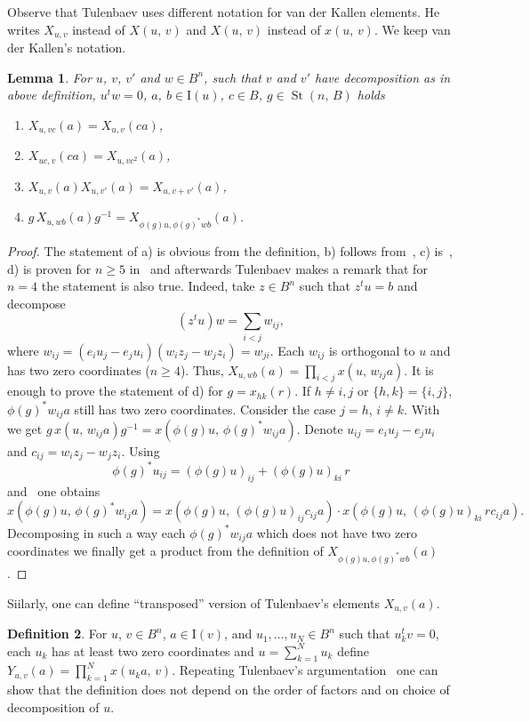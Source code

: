 \documentclass[11pt]{amsart}
\theoremstyle{plain} \declaretheorem[name=Theorem, Refname={Theorem,Theorems}]{tm} \Crefname{tm}{Theorem}{Theorems}
\numberwithin{equation}{section}
\newtheorem{lm}{Lemma} \numberwithin{lm}{section} \Crefname{lm}{Lemma}{Lemmas}
\theoremstyle{definition} \newtheorem{df}[lm]{Definition} \Crefname{df}{Definition}{Definitions}
\theoremstyle{remark} \newtheorem{rk}[lm]{Remark} \Crefname{rk}{Remark}{Remarks}
\newcommand{\St}{\mathop{\mathrm{St}}\nolimits}
\newcommand{\inv}{^{-1}}
\begin{document}
Observe that Tulenbaev uses different notation for van der Kallen elements. He writes $X_{u,v}$ instead of $X(u,\,v)$ and $X(u,\,v)$ instead of $x(u,\,v)$. We keep van der Kallen's notation.

\begin{lm}
\label{xproperties}
For $u$, $v$, $v'$ and $w\in B^n$, such that $v$ and $v'$ have decomposition as in above definition, $u^tw=0$, $a$, $b\in\mathrm I(u)$, $c\in B$, $g\in\St(n,\,B)$ holds
\begin{enumerate}
\item
$X_{u,vc}(a)=X_{u,v}(ca)$,
\item
$X_{uc,v}(ca)=X_{u,vc^2}(a)$,
\item
$X_{u,v}(a)X_{u,v'}(a)=X_{u,v+v'}(a)$,
\item
$g\,X_{u,wb}(a)g\inv=X_{\phi(g)u,\phi(g)^*wb}(a)$.
\end{enumerate}
\end{lm}

\begin{proof}
The statement of a) is obvious from the definition, b) follows from~\cite[Lem.~1.1\,d)]{Tul}, c) is~\cite[Lem.~1.3\,a)]{Tul}, d) is proven for $n\geq5$ in~\cite[Lem.~1.3\,b)]{Tul} and afterwards Tulenbaev makes a remark that for $n=4$ the statement is also true. Indeed, take $z\in B^n$ such that $z^tu=b$ and decompose
$$
(z^tu)w=\sum_{i<j}w_{ij},
$$
where $w_{ij}=(e_iu_j-e_ju_i)(w_iz_j-w_jz_i)=w_{ji}$. Each $w_{ij}$ is orthogonal to $u$ and has two zero coordinates ($n\geq4$). Thus, $X_{u,wb}(a)=\prod_{i<j}x(u,\,w_{ij}a)$. It is enough to prove the statement of d) for $g=x_{hk}(r)$. If $h\neq i,j$ or $\{h,k\}=\{i,j\}$, $\phi(g)^*w_{ij}a$ still has two zero coordinates. Consider the case $j=h$, $i\neq k$. With~\cite[3.12]{vdK} we get $g\,x(u,\,w_{ij}a)g\inv=x(\phi(g)u,\,\phi(g)^*w_{ij}a)$. Denote $u_{ij}=e_iu_j-e_ju_i$ and $c_{ij}=w_iz_j-w_jz_i$. Using
$$
\phi(g)^*u_{ij}=(\phi(g)u)_{ij}+(\phi(g)u)_{ki}\,r
$$
and~\cite[3.11]{vdK} one obtains
$$
x(\phi(g)u,\,\phi(g)^*w_{ij}a)=x(\phi(g)u,\,(\phi(g)u)_{ij}c_{ij}a)\cdot x(\phi(g)u,\,(\phi(g)u)_{ki}\,rc_{ij}a).
$$
Decomposing in such a way each $\phi(g)^*w_{ij}a$ which does not have two zero coordinates we finally get a product from the definition of $X_{\phi(g)u,\phi(g)^*wb}(a)$.
\end{proof}

Siilarly, one can define ``transposed'' version of Tulenbaev's elements $X_{u,v}(a)$.

\begin{df}
For $u$, $v\in B^n$, $a\in\mathrm I(v)$, and $u_1,\ldots,u_N\in B^n$ such that $u_k^tv=0$, each $u_k$ has at least two zero coordinates and $u=\sum_{k=1}^Nu_k$ define $Y_{u,v}(a)=\prod\limits_{k=1}^Nx(u_ka,\,v)$. Repeating Tulenbaev's argumentation~\cite[p.~3]{Tul} one can show that the definition does not depend on the order of factors and on choice of decomposition of $u$.
\end{df}
\end{document}
